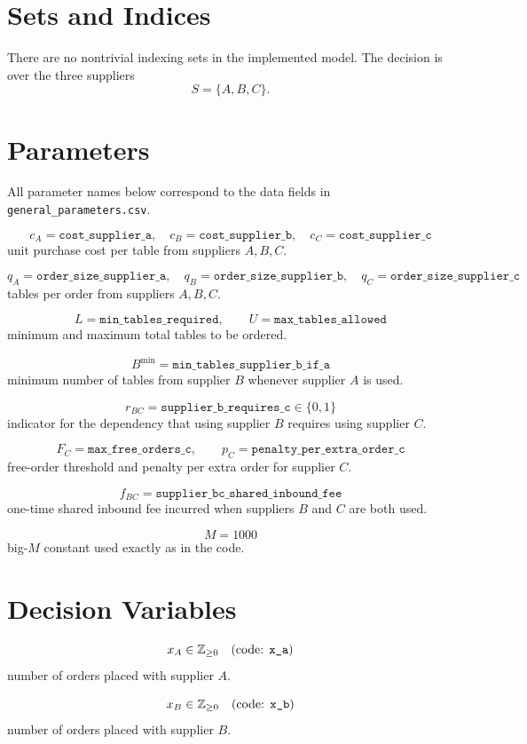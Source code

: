 \section*{Sets and Indices}

There are no nontrivial indexing sets in the implemented model. The decision is over the three suppliers
\[
S=\{A,B,C\}.
\]

\section*{Parameters}

All parameter names below correspond to the data fields in \texttt{general_parameters.csv}.

\[
c_A = \texttt{cost\_supplier\_a},\quad
c_B = \texttt{cost\_supplier\_b},\quad
c_C = \texttt{cost\_supplier\_c}
\]
unit purchase cost per table from suppliers \(A,B,C\).

\[
q_A = \texttt{order\_size\_supplier\_a},\quad
q_B = \texttt{order\_size\_supplier\_b},\quad
q_C = \texttt{order\_size\_supplier\_c}
\]
tables per order from suppliers \(A,B,C\).

\[
L = \texttt{min\_tables\_required},\qquad
U = \texttt{max\_tables\_allowed}
\]
minimum and maximum total tables to be ordered.

\[
B^{\min} = \texttt{min\_tables\_supplier\_b\_if\_a}
\]
minimum number of tables from supplier \(B\) whenever supplier \(A\) is used.

\[
r_{BC} = \texttt{supplier\_b\_requires\_c}\in\{0,1\}
\]
indicator for the dependency that using supplier \(B\) requires using supplier \(C\).

\[
F_C = \texttt{max\_free\_orders\_c},\qquad
p_C = \texttt{penalty\_per\_extra\_order\_c}
\]
free-order threshold and penalty per extra order for supplier \(C\).

\[
f_{BC} = \texttt{supplier\_bc\_shared\_inbound\_fee}
\]
one-time shared inbound fee incurred when suppliers \(B\) and \(C\) are both used.

\[
M = 1000
\]
big-\(M\) constant used exactly as in the code.

\section*{Decision Variables}

\[
x_A \in \mathbb{Z}_{\ge 0}\quad \text{(code: \texttt{x\_a})}
\]
number of orders placed with supplier \(A\).

\[
x_B \in \mathbb{Z}_{\ge 0}\quad \text{(code: \texttt{x\_b})}
\]
number of orders placed with supplier \(B\).

